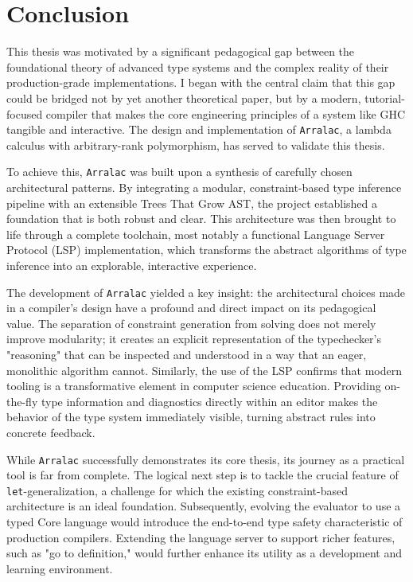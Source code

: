 \chapter{Conclusion}
\label{chap:Conclusion}

This thesis was motivated by a significant pedagogical gap between the foundational theory of advanced type systems and the complex reality of their production-grade implementations. I began with the central claim that this gap could be bridged not by yet another theoretical paper, but by a modern, tutorial-focused compiler that makes the core engineering principles of a system like GHC tangible and interactive. The design and implementation of \texttt{Arralac}, a lambda calculus with arbitrary-rank polymorphism, has served to validate this thesis.

To achieve this, \texttt{Arralac} was built upon a synthesis of carefully chosen architectural patterns. By integrating a modular, constraint-based type inference pipeline with an extensible Trees That Grow AST, the project established a foundation that is both robust and clear. This architecture was then brought to life through a complete toolchain, most notably a functional Language Server Protocol (LSP) implementation, which transforms the abstract algorithms of type inference into an explorable, interactive experience.

The development of \texttt{Arralac} yielded a key insight: the architectural choices made in a compiler's design have a profound and direct impact on its pedagogical value. The separation of constraint generation from solving does not merely improve modularity; it creates an explicit representation of the typechecker's "reasoning" that can be inspected and understood in a way that an eager, monolithic algorithm cannot. Similarly, the use of the LSP confirms that modern tooling is a transformative element in computer science education. Providing on-the-fly type information and diagnostics directly within an editor makes the behavior of the type system immediately visible, turning abstract rules into concrete feedback.

While \texttt{Arralac} successfully demonstrates its core thesis, its journey as a practical tool is far from complete. The logical next step is to tackle the crucial feature of \texttt{let}-generalization, a challenge for which the existing constraint-based architecture is an ideal foundation. Subsequently, evolving the evaluator to use a typed Core language would introduce the end-to-end type safety characteristic of production compilers. Extending the language server to support richer features, such as "go to definition," would further enhance its utility as a development and learning environment.

